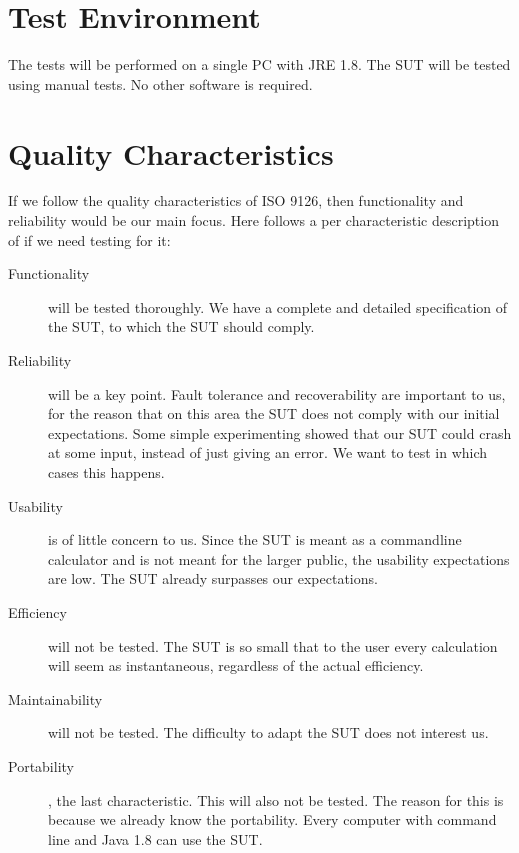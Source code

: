 \documentclass[11pt,a4paper]{article}
\begin{document}
\section{Test Environment}
The tests will be performed on a single PC with JRE 1.8. The SUT will be tested using manual tests. No other software is required.

\section{Quality Characteristics}


If we follow the quality characteristics of ISO 9126, then functionality and reliability would be our main focus. Here follows a per characteristic description of if we need testing for it:
\begin{description}
	\item[Functionality] will be tested thoroughly. We have a complete and detailed specification of the SUT, to which the SUT should comply.
	\item[Reliability] will be a key point. Fault tolerance and recoverability are important to us, for the reason that on this area the SUT does not comply with our initial expectations. Some simple experimenting showed that our SUT could crash at some input, instead of just giving an error. We want to test in which cases this happens.
	\item[Usability] is of little concern to us. Since the SUT is meant as a commandline calculator and is not meant for the larger public, the usability expectations are low. The SUT already surpasses our expectations.
	\item[Efficiency] will not be tested. The SUT is so small that to the user every calculation will seem as instantaneous, regardless of the actual efficiency.
	\item[Maintainability] will not be tested. The difficulty to adapt the SUT does not interest us.
	\item[Portability], the last characteristic. This will also not be tested. The reason for this is because we already know the portability. Every computer with command line and Java 1.8 can use the SUT.
\end{description}
\end{document}
